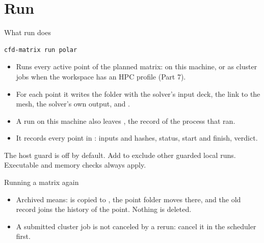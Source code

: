 \section{Run}

\begin{frame}[fragile]{What run does}
\begin{lstlisting}
cfd-matrix run polar
\end{lstlisting}
\begin{itemize}
  \item Runs every active point of the planned matrix: on this machine, or
        as cluster jobs when the workspace has an HPC profile (Part 7).
  \item For each point it writes the folder
         with the solver's
        input deck, the link to the mesh, the solver's own output,
         and .
  \item A run on this machine also leaves , the record
        of the process that ran.
  \item It records every point in : inputs and hashes,
        status, start and finish, verdict.
\end{itemize}
\begin{cfdblimit}
\small The host guard is off by default. Add  to
exclude other guarded local runs. Executable and memory checks always apply.
\end{cfdblimit}
\end{frame}

\begin{frame}{Running a matrix again}
\vspace{2mm}
\begin{itemize}\small
  \item Archived means:  is copied to
        , the point folder moves there, and the old
        record joins the history of the point. Nothing is deleted.
  \item A submitted cluster job is not canceled by a rerun: cancel it in
        the scheduler first.
\end{itemize}
\end{frame}


